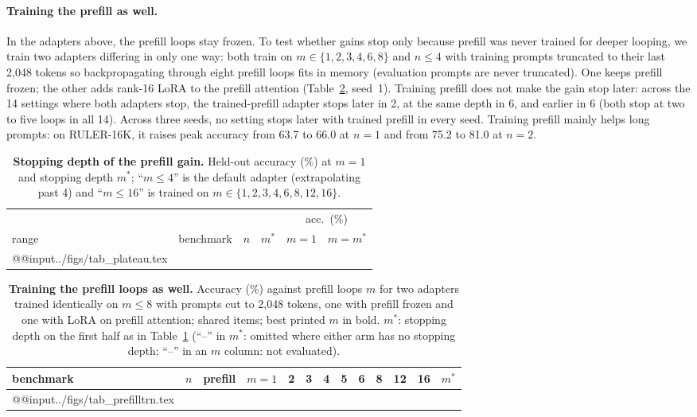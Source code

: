 \documentclass[11pt]{article}
\begin{document}
\paragraph{Training the prefill as well.} In the adapters above, the prefill loops stay frozen. To test whether gains stop
only because prefill was never trained for deeper looping, we train two adapters differing in only one way: both train on
$m\in\{1,2,3,4,6,8\}$ and $n\le4$ with training prompts truncated to their last 2,048 tokens so backpropagating through
eight prefill loops fits in memory (evaluation prompts are never truncated). One keeps prefill frozen; the other adds
rank-16 LoRA to the prefill attention (Table~\ref{tab:prefilltrn}, seed~1). Training prefill does not make the gain stop
later: across the 14 settings where both adapters stop, the trained-prefill adapter stops later in 2, at the same depth
in 6, and earlier in 6 (both stop at two to five loops in all 14). Across three seeds, no setting stops later with
trained prefill in every seed. Training prefill mainly helps long prompts: on RULER-16K, it raises peak accuracy from
63.7 to 66.0 at $n=1$ and from 75.2 to 81.0 at $n=2$.

\begin{table}[t]
\centering\footnotesize
\setlength\tabcolsep{3.2pt}
\begin{tabular}{@{}llrrrr@{}}
\toprule
 & & & & \multicolumn{2}{c}{acc.\ (\%)} \\
\cmidrule(l){5-6}
range & benchmark & $n$ & $m^\ast$ & $m{=}1$ & $m{=}m^\ast$ \\
\midrule
\csname @@input\endcsname ../figs/tab_plateau.tex
\bottomrule
\end{tabular}
\caption{\textbf{Stopping depth of the prefill gain.} Held-out accuracy (\%) at $m=1$ and stopping depth $m^\ast$;
``$m\le4$'' is the default adapter (extrapolating past 4) and ``$m\le16$'' is trained on
$m\in\{1,2,3,4,6,8,12,16\}$.}
\label{tab:plateau}
\end{table}

\begin{table}[t]
\centering\footnotesize
\setlength{\tabcolsep}{4pt}
\begin{tabular}{@{}lrlrrrrrrrrrr@{}}
\toprule
benchmark & $n$ & prefill & $m{=}1$ & 2 & 3 & 4 & 5 & 6 & 8 & 12 & 16 & $m^\ast$ \\
\midrule
\csname @@input\endcsname ../figs/tab_prefilltrn.tex
\bottomrule
\end{tabular}
\caption{\textbf{Training the prefill loops as well.} Accuracy (\%) against prefill loops $m$ for two adapters trained
identically on $m\le8$ with prompts cut to 2,048 tokens, one with prefill frozen and one with LoRA on prefill attention;
shared items; best printed $m$ in bold. $m^\ast$: stopping depth on the first half as in Table~\ref{tab:plateau}
(``--'' in $m^\ast$: omitted where either arm has no stopping depth; ``--'' in an $m$ column: not evaluated).}
\label{tab:prefilltrn}
\end{table}
\end{document}
